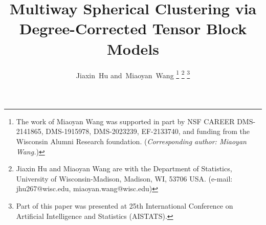 \documentclass[journal]{IEEEtran}
\theoremstyle{definition}
\theoremstyle{definition}
\begin{document}
%
\title{Multiway Spherical Clustering via \\ Degree-Corrected Tensor Block Models}
%
%
%

\author{Jiaxin~Hu
        and~Miaoyan~Wang%
\thanks{The work of Miaoyan Wang was supported in part by NSF CAREER DMS-2141865, DMS-1915978, DMS-2023239, EF-2133740, and funding from the Wisconsin Alumni Research foundation. (\textit{Corresponding author: Miaoyan Wang.})}
\thanks{Jiaxin Hu and Miaoyan Wang are with the Department of Statistics, University of Wisconsin-Madison, Madison, WI, 53706 USA. (e-mail: jhu267@wisc.edu, miaoyan.wang@wisc.edu)}%
\thanks{Part of this paper was presented at 25th International Conference on Artificial Intelligence and Statistics (AISTATS).}%
}

% 
%
\end{document}
